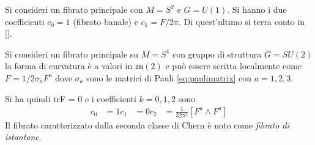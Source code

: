 \begin{example}\label{ex:monopolechern}
   Si consideri un fibrato principale con $M = S^2$ e $G = U(1)$. Si hanno i due
   coefficienti $c_0 = 1$ (fibrato banale) e $c_1 = F/2\pi$. Di quest'ultimo si
   terra conto in \ref{}.\\
\end{example}

\begin{example}\label{ex:istantonchern}
   Si consideri un fibrato principale su $M = S^4$ con gruppo di struttura
   $G = SU(2)$ la forma di curvatura è a valori in $\mathfrak{su(2)}$ e può
   essere scritta localmente come $F = 1/2\sigma_a F^a$ dove $\sigma_a$ sono le
   matrici di Pauli \ref{eq:paulimatrix} con $a = 1,2,3$.

   Si ha quindi trF = 0 e i coefficienti $k = 0,1,2$ sono
   \begin{equation}
      \begin{aligned}
         c_0 & = 1
         c_1 & = 0
         c_2 & = \frac{1}{32\pi^2}[ F^a \wedge F^a ]
      \end{aligned}
   \end{equation}
   Il fibrato caratterizzato dalla seconda classe di Chern è noto come
   \emph{fibrato di istantone}.
\end{example}
